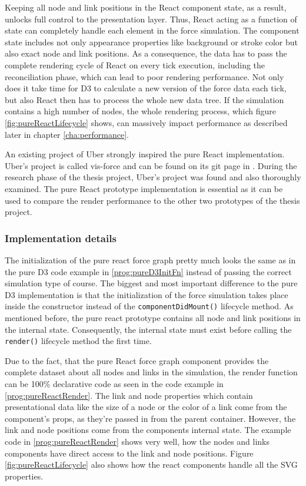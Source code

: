 Keeping all node and link positions in the React component state, as a result, unlocks full control to the presentation layer. Thus, React acting as a function of state can completely handle each element in the force simulation. The component state includes not only appearance properties like background or stroke color but also exact node and link positions. As a consequence, the data has to pass the complete rendering cycle of React on every tick execution, including the reconciliation phase, which can lead to poor rendering performance. Not only does it take time for D3 to calculate a new version of the force data each tick, but also React then has to process the whole new data tree. If the simulation contains a high number of nodes, the whole rendering process, which figure \ref{fig:pureReactLifecycle} shows, can massively impact performance as described later in chapter \ref{cha:performance}.

An existing project of Uber strongly inspired the pure React implementation. Uber's project is called vis-force and can be found on its git page in \cite{UberVisForce}. During the research phase of the thesis project, Uber's project was found and also thoroughly examined. The pure React prototype implementation is essential as it can be used to compare the render performance to the other two prototypes of the thesis project.

\subsubsection{Implementation details}

The initialization of the pure react force graph pretty much looks the same as in the pure D3 code example in \ref{prog:pureD3InitFn} instead of passing the correct simulation type of course. The biggest and most important difference to the pure D3 implementation is that the initialization of the force simulation takes place inside the constructor instead of the \texttt{componentDidMount()} lifecycle method. As mentioned before, the pure react prototype contains all node and link positions in the internal state. Consequently, the internal state must exist before calling the \texttt{render()} lifecycle method the first time.

Due to the fact, that the pure React force graph component provides the complete dataset about all nodes and links in the simulation, the render function can be 100\% declarative code as seen in the code example in \ref{prog:pureReactRender}. The link and node properties which contain presentational data like the size of a node or the color of a link come from the component's props, as they're passed in from the parent container. However, the link and node positions come from the components internal state. The example code in \ref{prog:pureReactRender} shows very well, how the nodes and links components have direct access to the link and node positions. Figure \ref{fig:pureReactLifecycle} also shows how the react components handle all the SVG properties.


